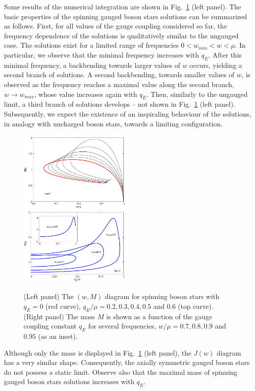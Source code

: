 Some results of the numerical integration are shown in Fig.~\ref{fig:w-M-gauged} (left panel).
The basic properties of the spinning gauged boson stars solutions can be summarized as follows.
First, for all values of the gauge coupling considered so far, 
the frequency dependence of the solutions is qualitatively similar to the ungauged case.
The solutions 
exist for a limited range of frequencies
$0<w_{min}<w<\mu$. 
In particular, we observe that the minimal frequency increases with $q_E$. 
After this minimal frequency, a backbending towards larger values of $w$ occurs, yielding a second branch of solutions. 
A second backbending, towards
smaller values of $w$,  is observed as the frequency reaches a maximal value along the second branch, $w\to w_{max}$, whose value increases again with $q_E$. 
Then, similarly to the ungauged limit, a third branch of solutions develops -- not shown in Fig.~\ref{fig:w-M-gauged} (left panel).
Subsequently, we expect the existence of an inspiraling behaviour of the solutions, 
in analogy with uncharged boson stars, towards a limiting configuration.  


\begin{figure}[H]
  \begin{center}
    \includegraphics[width=0.497\textwidth]{papers/KerrNewman/BS-w-M-gauged}
      \includegraphics[width=0.497\textwidth]{papers/KerrNewman/BS-g-M-gauged}
  \end{center}
  \caption{
	(Left panel)
	The $(w,M)$ diagram for spinning boson stars with $q_E=0$ (red curve), $q_E/\mu=0.2, 0.3, 0.4, 0.5$
	and $0.6$ (top curve).  
		(Right panel)
	The mass $M$ is shown as a function of the gauge coupling constant $q_E$
	for several frequencies, $w/\mu=0.7, 0.8, 0.9$ and $0.95$ (as an inset).	}
  \label{fig:w-M-gauged}
\end{figure}
Although only the mass is displayed in Fig.~\ref{fig:w-M-gauged} (left panel), the $J(w)$
diagram has a very similar shape.
Consequently,  the axially symmetric gauged boson stars do not possess
a static limit.  Observe also that the maximal mass of spinning gauged boson stars solutions increases with $q_E$.


